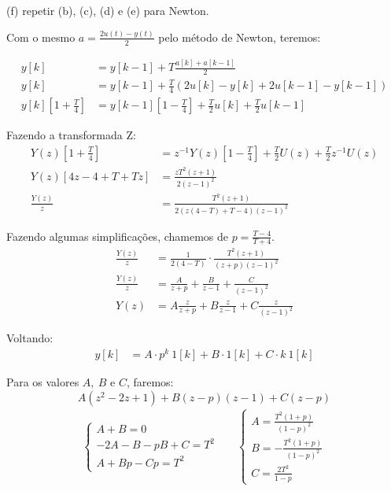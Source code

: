 \documentclass[10pt]{article}
\begin{document}
(f) repetir (b), (c), (d) e (e) para Newton.

Com o mesmo $a = \frac{2u(t) - y(t)}{2}$ pelo método de Newton, teremos:

\begin{align*}
    y[k] &= y[k - 1] + T \frac{a[k] + a[k - 1]}{2}\\
    y[k] &= y[k - 1] + \frac{T}{4} \left(2u[k] - y[k] + 2u[k - 1] - y[k - 1]\right)\\
    y[k] \left[1 + \frac{T}{4}\right] &= y[k - 1] \left[1 - \frac{T}{4}\right] + \frac{T}{2} u[k] + \frac{T}{2} u[k - 1]
\end{align*}

Fazendo a transformada Z:
\begin{align*}
    Y(z) \left[1 + \frac{T}{4}\right] &= z^{-1}Y(z) \left[1 - \frac{T}{4}\right] + \frac{T}{2} U(z) + \frac{T}{2} z^{-1}U(z)\\
    Y(z) \left[4z - 4 + T + Tz\right] &= \frac{zT^2(z + 1)}{2(z-1)^2}\\
    \frac{Y(z)}{z} &= \frac{T^2(z + 1)}{2(z(4 - T) + T - 4)(z - 1)^2}
\end{align*}

Fazendo algumas simplificações, chamemos de $p = \frac{T - 4}{T + 4}$.
\begin{align*}
    \frac{Y(z)}{z} &= \frac{1}{2(4 - T)} \cdot \frac{T^2 (z + 1)}{(z + p)(z - 1)^2}\\
    \frac{Y(z)}{z} &= \frac{A}{z + p} + \frac{B}{z - 1} + \frac{C}{(z - 1)^2}\\
    Y(z) &= A \frac{z}{z + p} + B \frac{z}{z - 1} + C \frac{z}{(z - 1)^2}
\end{align*}

Voltando:
\begin{align*}
    y[k] &= A \cdot p^k \ 1[k] + B \cdot 1[k] + C \cdot k \ 1[k]
\end{align*}

Para os valores $A, \ B$ e $C$, faremos:
\[A(z^2 - 2z + 1) + B(z - p)(z - 1) + C(z - p)\]
\begin{align*}
    \begin{cases}
        A + B = 0\\
        -2A - B - pB + C = T^2\\
        A + Bp - Cp = T^2
    \end{cases}
    & &
    \begin{cases}
        A = \frac{T^2(1 + p)}{(1 - p)^2}\\
        B = -\frac{T^2(1 + p)}{(1 - p)^2}\\
        C = \frac{2T^2}{1 - p}
    \end{cases}
\end{align*}
\end{document}
